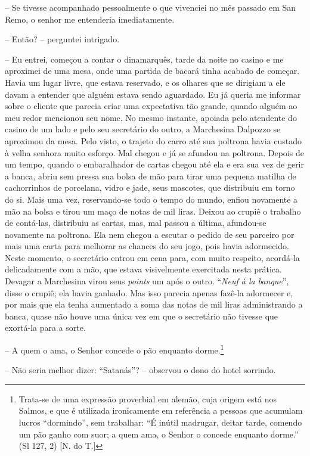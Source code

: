 -- Se tivesse acompanhado pessoalmente o que vivenciei no mês passado em
San Remo, o senhor me entenderia imediatamente.

-- Então? -- perguntei intrigado.

-- Eu entrei, começou a contar o dinamarquês, tarde da noite no casino e
me aproximei de uma mesa, onde uma partida de bacará tinha acabado de
começar. Havia um lugar livre, que estava reservado, e os olhares que se
dirigiam a ele davam a entender que alguém estava sendo aguardado. Eu já
queria me informar sobre o cliente que parecia criar uma expectativa tão
grande, quando alguém ao meu redor mencionou seu nome. No mesmo
instante, apoiada pelo atendente do casino de um lado e pelo seu
secretário do outro, a Marchesina Dalpozzo se aproximou da mesa. Pelo
visto, o trajeto do carro até sua poltrona havia custado à velha senhora
muito esforço. Mal chegou e já se afundou na poltrona. Depois de um
tempo, quando o embaralhador de cartas chegou até ela e era sua vez de
gerir a banca, abriu sem pressa sua bolsa de mão para tirar uma pequena
matilha de cachorrinhos de porcelana, vidro e jade, seus mascotes, que
distribuiu em torno do si. Mais uma vez, reservando-se todo o tempo do
mundo, enfiou novamente a mão na bolsa e tirou um maço de notas de mil
liras. Deixou ao crupiê o trabalho de contá-las, distribuiu as cartas,
mas, mal passou a última, afundou-se novamente na poltrona. Ela nem
chegou a escutar o pedido de seu parceiro por mais uma carta para
melhorar as chances do seu jogo, pois havia adormecido. Neste momento, o
secretário entrou em cena para, com muito respeito, acordá-la
delicadamente com a mão, que estava visivelmente exercitada nesta
prática. Devagar a Marchesina virou seus \emph{points} um após o outro.
``\emph{Neuf à la banque}'', disse o crupiê; ela havia ganhado. Mas isso
parecia apenas fazê-la adormecer e, por mais que ela tenha aumentado a
soma das notas de mil liras administrando a banca, quase não houve uma
única vez em que o secretário não tivesse que exortá-la para a sorte.

-- A quem o ama, o Senhor concede o pão enquanto dorme.\footnote{Trata-se
  de uma expressão proverbial em alemão, cuja origem está nos Salmos, e
  que é utilizada ironicamente em referência a pessoas que acumulam
  lucros ``dormindo'', sem trabalhar: ``É inútil madrugar, deitar tarde,
  comendo um pão ganho com suor; a quem ama, o Senhor o concede enquanto
  dorme.'' (Sl 127, 2) {[}N. do T.{]}}

-- Não seria melhor dizer: ``Satanás''? -- observou o dono do hotel
sorrindo.

